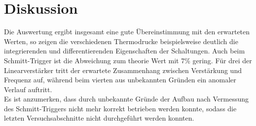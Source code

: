 \section{Diskussion}
Die Auswertung ergibt insgesamt eine gute Übereinstimmung mit den erwarteten Werten, so zeigen die verschiedenen Thermodrucke beispielsweise deutlich die integrierenden und differentierenden Eigenschaften der Schaltungen. Auch beim Schmitt-Trigger ist die Abweichung zum theorie Wert mit 7$\%$ gering. Für drei der Linearverstärker tritt der erwartete Zusammenhang zwischen Verstärkung und Frequenz auf, während beim vierten aus unbekannten Gründen ein anomaler Verlauf auftritt.\\
Es ist anzumerken, dass durch unbekannte Gründe der Aufbau nach Vermessung des Schmitt-Triggers nicht mehr korrekt betrieben werden konnte, sodass die letzten Versuchsabschnitte nicht durchgeführt werden konnten.
